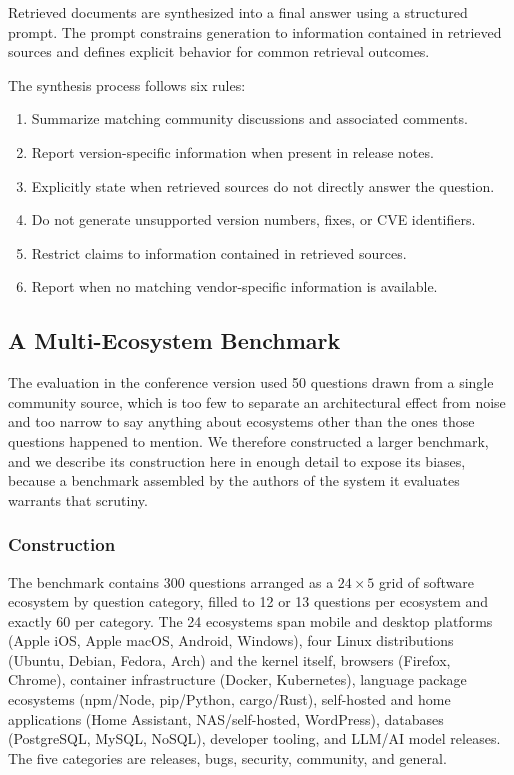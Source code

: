 \documentclass[acmsmall,review,anonymous,screen]{acmart}
\begin{document}
Retrieved documents are synthesized into a final answer using a
structured prompt. The prompt constrains generation to information
contained in retrieved sources and defines explicit behavior for
common retrieval outcomes.

The synthesis process follows six rules:

\begin{enumerate}
\item Summarize matching community discussions and associated comments.
\item Report version-specific information when present in release notes.
\item Explicitly state when retrieved sources do not directly answer the question.
\item Do not generate unsupported version numbers, fixes, or CVE identifiers.
\item Restrict claims to information contained in retrieved sources.
\item Report when no matching vendor-specific information is available.
\end{enumerate}

\subsection{A Multi-Ecosystem Benchmark}\label{sec:benchmark}

The evaluation in the conference version used 50 questions drawn from a single
community source, which is too few to separate an architectural effect from
noise and too narrow to say anything about ecosystems other than the ones those
questions happened to mention. We therefore constructed a larger benchmark, and
we describe its construction here in enough detail to expose its biases, because
a benchmark assembled by the authors of the system it evaluates warrants that
scrutiny.

\subsubsection{Construction}

The benchmark contains 300 questions arranged as a $24 \times 5$ grid of
software ecosystem by question category, filled to 12 or 13 questions per
ecosystem and exactly 60 per category. The 24 ecosystems span mobile and desktop
platforms (Apple iOS, Apple macOS, Android, Windows), four Linux distributions
(Ubuntu, Debian, Fedora, Arch) and the kernel itself, browsers (Firefox,
Chrome), container infrastructure (Docker, Kubernetes), language package
ecosystems (npm/Node, pip/Python, cargo/Rust), self-hosted and home applications
(Home Assistant, NAS/self-hosted, WordPress), databases (PostgreSQL, MySQL,
NoSQL), developer tooling, and LLM/AI model releases. The five categories are
releases, bugs, security, community, and general.
\end{document}

